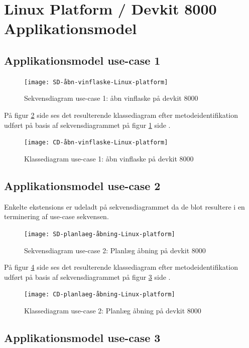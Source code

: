\section{Linux Platform / Devkit 8000 Applikationsmodel}

\subsection{Applikationsmodel use-case 1}
\begin{figure}[H]
\caption{Sekvensdiagram use-case 1: åbn vinflaske på devkit 8000}
\label{SD:UC1-devkit}
\texttt{[image: SD-åbn-vinflaske-Linux-platform]}
\end{figure}

På figur \ref{CD:UC1-devkit} side \pageref{CD:UC1-devkit} ses det resulterende klassediagram efter metodeidentifikation udført på basis af sekvensdiagrammet på figur \ref{SD:UC1-devkit} side \pageref{SD:UC1-devkit}.
\begin{figure}[H]
	\caption{Klassediagram use-case 1: åbn vinflaske på devkit 8000}
	\label{CD:UC1-devkit}
	\texttt{[image: CD-åbn-vinflaske-Linux-platform]}
\end{figure}

\subsection{Applikationsmodel use-case 2}

Enkelte ekstensions er udeladt på sekvensdiagrammet da de blot resultere i en terminering af use-case sekvensen.

\begin{figure}[H]
	\caption{Sekvensdiagram use-case 2: Planlæg åbning på devkit 8000}
	\label{SD:UC2-devkit}
	\texttt{[image: SD-planlaeg-åbning-Linux-platform]}
\end{figure}

På figur \ref{CD:UC2-devkit} side \pageref{CD:UC2-devkit} ses det resulterende klassediagram efter metodeidentifikation udført på basis af sekvensdiagrammet på figur \ref{SD:UC2-devkit} side \pageref{SD:UC2-devkit}.
\begin{figure}[H]
	\caption{Klassediagram use-case 2: Planlæg åbning på devkit 8000}
	\label{CD:UC2-devkit}
	\texttt{[image: CD-planlaeg-åbning-Linux-platform]}
\end{figure}

\subsection{Applikationsmodel use-case 3}

